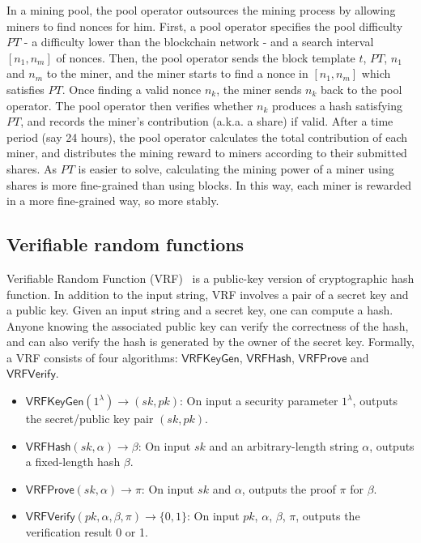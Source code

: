 In a mining pool, the pool operator outsources the mining process by allowing miners to find nonces for him.
First, a pool operator specifies the pool difficulty $PT$ - a difficulty lower than the blockchain network - and a search interval $[n_1, n_m]$ of nonces.
Then, the pool operator sends the block template $t$, $PT$, $n_1$ and $n_m$ to the miner, and the miner starts to find a nonce in $[n_1, n_m]$ which satisfies $PT$.
Once finding a valid nonce $n_k$, the miner sends $n_k$ back to the pool operator.
The pool operator then verifies whether $n_k$ produces a hash satisfying $PT$, and records the miner's contribution (a.k.a. a share) if valid.
After a time period (say 24 hours), the pool operator calculates the total contribution of each miner, and distributes the mining reward to miners according to their submitted shares.
As $PT$ is easier to solve, calculating the mining power of a miner using shares is more fine-grained than using blocks.
In this way, each miner is rewarded in a more fine-grained way, so more stably.


\subsection{Verifiable random functions}

Verifiable Random Function (VRF)~\cite{micali1999verifiable} is a public-key version of cryptographic hash function.
In addition to the input string, VRF involves a pair of a secret key and a public key.
Given an input string and a secret key, one can compute a hash.
Anyone knowing the associated public key can verify the correctness of the hash, and can also verify the hash is generated by the owner of the secret key.
Formally, a VRF consists of four algorithms: $\mathsf{VRFKeyGen}$, $\mathsf{VRFHash}$, $\mathsf{VRFProve}$ and $\mathsf{VRFVerify}$.

\begin{itemize}
    \item $\mathsf{VRFKeyGen}(1^{\lambda}) \to (sk, pk)$: On input a security parameter $1^{\lambda}$, outputs the secret/public key pair $(sk, pk)$.
    \item $\mathsf{VRFHash}(sk, \alpha) \to \beta $: On input $sk$ and an arbitrary-length string $\alpha$, outputs a fixed-length hash $\beta$.
    \item $\mathsf{VRFProve}(sk, \alpha) \to \pi$: On input $sk$ and $\alpha$, outputs the proof $\pi$ for $\beta$.
    \item $\mathsf{VRFVerify}(pk, \alpha, \beta, \pi) \to \{0, 1\}$: On input $pk$, $\alpha$, $\beta$, $\pi$, outputs the verification result 0 or 1.
\end{itemize}

